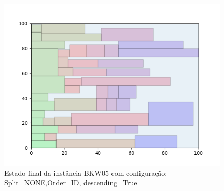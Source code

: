 \begin{figure}[H]
    \centering
    \caption[]{Estado final da instância BKW05 com configuração: Split=NONE,Order=ID, descending=True}
    \label{fig:bkw05-none-id-true}
    \includegraphics[scale=0.5]{output/figures/bkw/bkw05/none/id/true/00}
\end{figure}